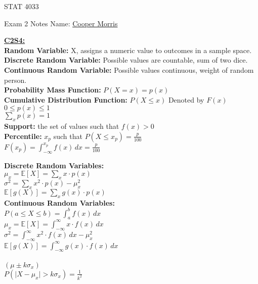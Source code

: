 \documentclass[letter, 12pt]{article}
\begin{document}
\begin{center}
STAT 4033
\end{center}
Exam 2 Notes \hfill Name: \uline{Cooper Morris}
\begin{multicols}{2}
\textbf{\uline{C2S4:}}\\
\textbf{Random Variable:} X, assigns a numeric value to outcomes in a sample space.\\
\textbf{Discrete Random Variable:} Possible values are countable, sum of two dice.\\
\textbf{Continuous Random Variable:} Possible values continuous, weight of random person.\\
\textbf{Probability Mass Function:} \(P(X=x) = p(x)\) \\
\textbf{Cumulative Distribution Function:} \(P(X\leq x) \) Denoted by \(F(x)\) \\
\(0\leq p(x) \leq 1\)\\
\(\sum_xp(x) = 1\)\\
\textbf{Support:} the set of values such that \(f(x) > 0	\)\\
\textbf{Percentile:} \(x_p\) such that \(P(X\leq x_p) = \frac{p}{100}\)\\
\(F(x_p) = \int_{-\infty}^{x_p} f(x)\,dx = \frac{p}{100}\)\\
\vfill
\columnbreak
\vspace*{\fill}
\end{multicols}
\newpage
\begin{multicols}{2}
\textbf{Discrete Random Variables:}\\
\(\mu_x = \mathds{E}[X] = \sum_xx\cdot p(x)\)\\
\(\sigma^2 = \sum_xx^2\cdot p(x) - \mu_x^2\)\\
\(\mathds{E}[g(X)] = \sum_xg(x)\cdot p(x)\)\\
\textbf{Continuous Random Variables:}\\
\(P(a\leq X \leq b) = \int_a^b f(x)\,dx\)\\
\(\mu_x = \mathds{E}[X] = \int_{-\infty}^\infty x \cdot f(x)\,dx\)\\
\(\sigma^2 = \int_{-\infty}^\infty x^2\cdot f(x)\,dx - \mu_x^2 \)\\
\(\mathds{E}[g(X)] = \int_{-\infty}^\infty  g(x) \cdot f(x)\,dx\)\\
\\ \( (\mu \pm k\sigma_x)\)\\
\(P(\vert X - \mu_x \vert > k\sigma_x) = \frac{1}{k^2}\)
\vfill
\columnbreak
\vspace*{\fill}
\end{multicols}
\end{document}
